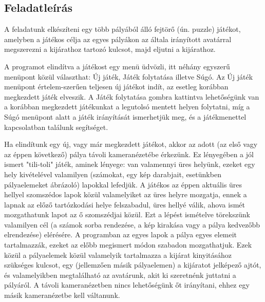 \subsection{Feladatleírás}

A feladatunk elkészíteni egy több pályából álló fejtörő (ún. puzzle) játékot, amelyben a játékos célja az egyes pályákon az általa irányított avatárral megszerezni a kijárathoz tartozó kulcsot, majd eljutni a kijárathoz.\medskip

A programot elindítva a játékost egy menü üdvözli, itt néhány egyszerű menüpont közül választhat: Új játék, Játék folytatása illetve Súgó. Az Új játék menüpont értelem-szerűen teljesen új játékot indít, az esetleg korábban megkezdett játék elveszik. A Játék folytatása gombra kattintva lehetőségünk van a korábban megkezdett játékunkat a legutolsó mentett helyen folytatni, míg a Súgó menüpont alatt a játék irányítását ismerhetjük meg, és a játékmenettel kapcsolatban találunk segítséget.\medskip

Ha elindítunk egy új, vagy már megkezdett játékot, akkor az adott (az első vagy az éppen következő) pálya távoli kameranézetébe érkezünk. Ez lényegében a jól ismert "tili-toli" játék, aminek lényege: van valamennyi üres helyünk, ezeket egy hely kivételével valamilyen (számokat, egy kép darabjait, esetünkben pályaelemeket ábrázoló) lapokkal lefedjük. A játékos az éppen aktuális üres hellyel szomszédos lapok közül valamelyiket az üres helyre mozgatja, ennek a lapnak az előző tartózkodási helye felszabadul, üres hellyé válik, ahova ismét mozgathatunk lapot az ő szomszédjai közül. Ezt a lépést ismételve törekszünk valamilyen cél (a számok sorba rendezése, a kép kirakása vagy a pálya kedvezőbb elrendezése) elérésére. A programban az egyes lapok a pálya egyes elemeit tartalmazzák, ezeket az előbb megismert módon szabadon mozgathatjuk. Ezek közül a pályaelemek közül valamelyik tartalmazza a kijárat kinyitásához szükséges kulcsot, egy (jellemzően másik pályaelemen) a kijáratot jelképező ajtót, és valamelyikben megtalálható az avatárunk, akit ki szeretnénk juttatni a pályáról. A távoli kameranézetben nincs lehetőségünk őt irányítani, ehhez egy másik kameranézetbe kell váltanunk.\medskip

